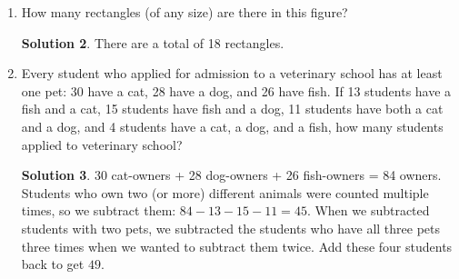 \documentclass{article}
\theoremstyle{definition}
\newtheorem*{solution}{Solution}
\begin{document}
\begin{enumerate}
\begin{solution}
        \end{solution}
        \pagebreak
        \item How many rectangles (of any size) are there in this figure?
        \begin{center}
        \end{center}
        \begin{solution}
            There are a total of 18 rectangles.
        \end{solution}
        \item Every student who applied for admission to a veterinary school has at least one
        pet: 30 have a cat, 28 have a dog, and 26 have fish. If 13 students have a fish and a
        cat, 15 students have fish and a dog, 11 students have both a cat and a dog, and 4
        students have a cat, a dog, and a fish, how many students applied to veterinary school?
        \begin{solution}
            30 cat-owners + 28 dog-owners + 26 fish-owners = 84 owners. Students who own two
            (or more) different animals were counted multiple times, so we subtract them:
            $84 - 13 - 15 - 11 = 45$. When we subtracted students with two pets, we subtracted
            the students who have all three pets three times when we wanted to subtract them twice.
            Add these four students back to get $49$.
        \end{solution}
    \end{enumerate}
\end{document}
